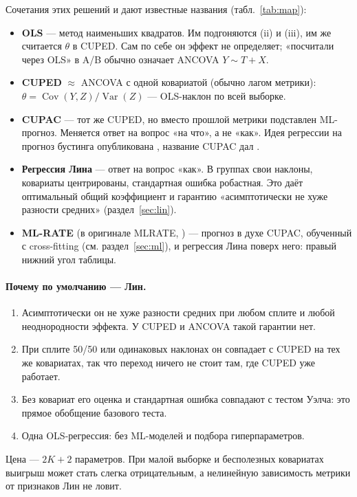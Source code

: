 \documentclass[10pt,a4paper]{article}
\newcommand{\Var}{\operatorname{Var}}
\newcommand{\Cov}{\operatorname{Cov}}
\begin{document}
Сочетания этих решений и дают известные названия (табл.~\ref{tab:map}):
\begin{itemize}
  \item \textbf{OLS} --- метод наименьших квадратов. Им подгоняются (ii) и (iii), им же считается $\theta$
        в CUPED. Сам по себе он эффект не определяет; «посчитали через OLS» в A/B обычно означает ANCOVA $Y\sim T+X$.
  \item \textbf{CUPED} $\approx$ ANCOVA с одной ковариатой (обычно лагом метрики):
        $\theta=\Cov(Y,Z)/\Var(Z)$ --- OLS-наклон по всей выборке.
  \item \textbf{CUPAC} --- тот же CUPED, но вместо прошлой метрики подставлен ML-прогноз. Меняется ответ на
        вопрос «на что», а не «как». Идея регрессии на прогноз бустинга опубликована \citet{poyarkov2016},
        название CUPAC дал \citet{doordash2020cupac}.
  \item \textbf{Регрессия Лина} --- ответ на вопрос «как». В группах свои наклоны, ковариаты центрированы,
        стандартная ошибка робастная. Это даёт оптимальный общий коэффициент и гарантию
        «асимптотически не хуже разности средних» (раздел~\ref{sec:lin}).
  \item \textbf{ML-RATE} (в оригинале MLRATE, \citealp{guo2021mlrate}) --- прогноз в духе CUPAC, обученный
        с cross-fitting (см. раздел~\ref{sec:ml}), и регрессия Лина поверх него: правый нижний угол таблицы.
\end{itemize}

\paragraph{Почему по умолчанию --- Лин.}
\begin{enumerate}
  \item Асимптотически он не хуже разности средних при любом сплите и любой неоднородности эффекта.
        У CUPED и ANCOVA такой гарантии нет.
  \item При сплите 50/50 или одинаковых наклонах он совпадает с CUPED на тех же ковариатах, так что переход
        ничего не стоит там, где CUPED уже работает.
  \item Без ковариат его оценка и стандартная ошибка совпадают с тестом Уэлча: это прямое обобщение базового теста.
  \item Одна OLS-регрессия: без ML-моделей и подбора гиперпараметров.
\end{enumerate}
Цена --- $2K+2$ параметров. При малой выборке и бесполезных ковариатах выигрыш может стать слегка
отрицательным, а нелинейную зависимость метрики от признаков Лин не ловит.
\end{document}
